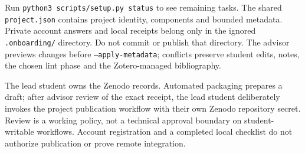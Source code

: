 Run \texttt{python3 scripts/setup.py status} to see remaining tasks.
The shared \texttt{project.json} contains project identity, components and bounded
metadata. Private account answers and local receipts belong only in the ignored
\texttt{.onboarding/} directory. Do not commit or publish that directory.
The advisor previews changes before \texttt{--apply-metadata}; conflicts preserve
student edits, notes, the chosen lint phase and the Zotero-managed bibliography.

The lead student owns the Zenodo records. Automated packaging prepares a draft;
after advisor review of the exact receipt, the lead student deliberately invokes
the project publication workflow with their own Zenodo repository secret.
Review is a working policy, not a technical approval boundary on student-writable
workflows. Account registration and a completed local checklist do not authorize
publication or prove remote integration.
